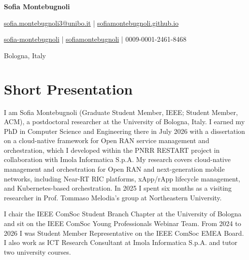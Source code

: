 \documentclass[a4paper,11pt]{article}
\newcommand{\socialicon}[1]{\raisebox{-0.05em}{\resizebox{!}{1em}{#1}}}
\newcommand{\headerfontiii}{\fontfamily{ppl}\selectfont}
\begin{document}
\headerfontiii

\begin{center}
    {\Huge\textbf{Sofia Montebugnoli}}
\end{center}
\vspace{-6mm}

\begin{center}
    \small{
    \href{mailto:sofia.montebugnoli3@unibo.it}{sofia.montebugnoli3@unibo.it} |
    \href{https://sofiamontebugnoli.github.io/}{sofiamontebugnoli.github.io}
    }
\end{center}
\vspace{-6mm}

\begin{center}
    \small{
    \socialicon{\faLinkedin} \href{https://www.linkedin.com/in/sofia-montebugnoli-016440284/}{sofia-montebugnoli} |
    \socialicon{\faGithub} \href{https://github.com/sofiamontebugnoli}{sofiamontebugnoli} |
     0009-0001-2461-8468
    }
\end{center}
\vspace{-6mm}
\begin{center}
    \small{Bologna, Italy}
\end{center}

\vspace{-4mm}

\section{\textbf{Short Presentation}}
\vspace{1mm}
\small{
I am Sofia Montebugnoli (Graduate Student Member, IEEE; Student Member, ACM), a postdoctoral researcher at the University of Bologna, Italy. I earned my PhD in Computer Science and Engineering there in July 2026 with a dissertation on a cloud-native framework for Open RAN service management and orchestration, which I developed within the PNRR RESTART project in collaboration with Imola Informatica S.p.A. My research covers cloud-native management and orchestration for Open RAN and next-generation mobile networks, including Near-RT RIC platforms, xApp/rApp lifecycle management, and Kubernetes-based orchestration. In 2025 I spent six months as a visiting researcher in Prof. Tommaso Melodia's group at Northeastern University.

I chair the IEEE ComSoc Student Branch Chapter at the University of Bologna and sit on the IEEE ComSoc Young Professionals Webinar Team. From 2024 to 2026 I was Student Member Representative on the IEEE ComSoc EMEA Board. I also work as ICT Research Consultant at Imola Informatica S.p.A. and tutor two university courses.
}
\vspace{-2mm}
\end{document}
